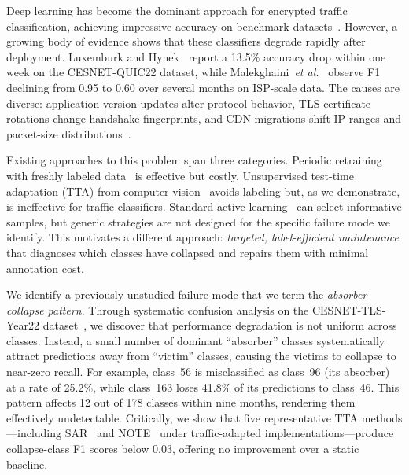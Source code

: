 \documentclass[journal]{IEEEtran}
\makeatletter
\newcommand{\etal}{\textit{et al.}\@}
\makeatother
\begin{document}
Deep learning has become the dominant approach for encrypted traffic classification, achieving impressive accuracy on benchmark datasets~\cite{luxemburk2023quic, lin2022etbert, zhao2023yatc, pacheco2019towards, wang2019survey}.
However, a growing body of evidence shows that these classifiers degrade rapidly after deployment.
Luxemburk and Hynek~\cite{luxemburk2023quic} report a 13.5\% accuracy drop within one week on the CESNET-QUIC22 dataset, while Malekghaini~\etal{}~\cite{malekghaini2023drift} observe F1 declining from 0.95 to 0.60 over several months on ISP-scale data.
The causes are diverse: application version updates alter protocol behavior, TLS certificate rotations change handshake fingerprints, and CDN migrations shift IP ranges and packet-size distributions~\cite{soukup2025drift, lu2019learning, gama2014survey}.

Existing approaches to this problem span three categories.
Periodic retraining with freshly labeled data~\cite{chen2025selfevolving} is effective but costly.
Unsupervised test-time adaptation (TTA) from computer vision~\cite{wang2021tent, niu2022eata, niu2023sar} avoids labeling but, as we demonstrate, is ineffective for traffic classifiers.
Standard active learning~\cite{settles2009active, sener2018coreset, ash2020badge} can select informative samples, but generic strategies are not designed for the specific failure mode we identify.
This motivates a different approach: \textit{targeted, label-efficient maintenance} that diagnoses which classes have collapsed and repairs them with minimal annotation cost.

We identify a previously unstudied failure mode that we term the \textit{absorber-collapse pattern}.
Through systematic confusion analysis on the CESNET-TLS-Year22 dataset~\cite{hynek2024cesnet}, we discover that performance degradation is not uniform across classes.
Instead, a small number of dominant ``absorber'' classes systematically attract predictions away from ``victim'' classes, causing the victims to collapse to near-zero recall.
For example, class~56 is misclassified as class~96 (its absorber) at a rate of 25.2\%, while class~163 loses 41.8\% of its predictions to class~46.
This pattern affects 12 out of 178 classes within nine months, rendering them effectively undetectable.
Critically, we show that five representative TTA methods---including SAR~\cite{niu2023sar} and NOTE~\cite{gong2022note} under traffic-adapted implementations---produce collapse-class F1 scores below 0.03, offering no improvement over a static baseline.
\end{document}
